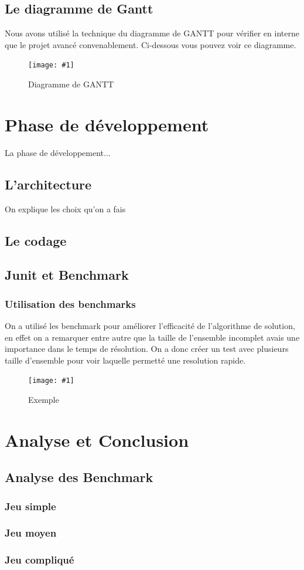 \documentclass[a4paper,twoside,12pt]{report}
\newcommand{\monimage}[3]{
\par\noindent
\begin{figure}[H] %
\begin{center}
\texttt{[image: \#1]} %
\caption{#2} %
\label{#3} %
\end{center}
\end{figure} %
}
\begin{document}
\section{Le diagramme de Gantt}
%
Nous avons utilisé la technique du diagramme de GANTT pour vérifier en interne que le projet avancé convenablement. Ci-dessous vous pouvez voir ce
diagramme.
\monimage{DiagrammeDeGantt.pdf}{Diagramme de GANTT}{DG}
\chapter{Phase de développement}
%
La phase de développement...
\section{L'architecture}
On explique les choix qu'on a fais
\section{Le codage}
%
\section{Junit et Benchmark}
%
\subsection{Utilisation des benchmarks}
On a utilisé les benchmark pour améliorer l'efficacité de l'algorithme de solution, en effet on a remarquer entre autre que la taille de l'ensemble
incomplet avais une importance dans le temps de résolution. On a donc créer un test avec plusieurs taille d'ensemble pour voir laquelle 
permetté une resolution rapide.
\monimage{ensembleincomplettest2.pdf}{Exemple}{EX}
\chapter{Analyse et Conclusion}
%
\section{Analyse des Benchmark}
%
\subsection{Jeu simple}
%
\subsection{Jeu moyen}
%
\subsection{Jeu compliqué}
%
\end{document}
